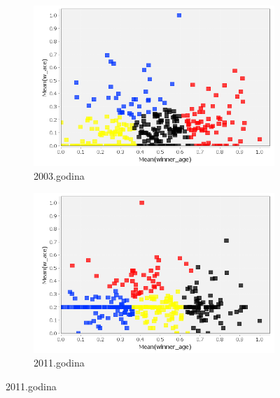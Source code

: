 \documentclass[a4paper]{article}
\begin{document}
\begin{figure}[H]
	\begin{subfigure}[h]{\textwidth}
		\begin{center}
			\includegraphics[scale=0.40]{Klasterovanje/ScatterPlot_KMeans2003.png}
		\end{center}
		\caption{2003.godina}
		\label{fig:KNIME_ScatterPlot2003}
	\end{subfigure}
	
	\vspace{0.5cm}
	\begin{subfigure}[h]{\textwidth}
		\begin{center}
			\includegraphics[scale=0.40]{Klasterovanje/ScatterPlot_KMeans2011.png}
		\end{center}
		\caption{2011.godina}
		\label{KNIME_ScatterPlot2011}
	\end{subfigure}
	

\end{figure}
\end{document}
